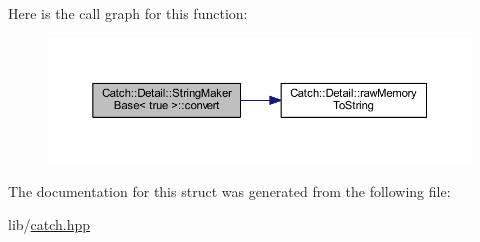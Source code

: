 Here is the call graph for this function\+:\nopagebreak
\begin{figure}[H]
\begin{center}
\leavevmode
\includegraphics[width=350pt]{struct_catch_1_1_detail_1_1_string_maker_base_3_01true_01_4_af9b5fdf7fddd8c5c873caa819e5f00f6_cgraph}
\end{center}
\end{figure}


The documentation for this struct was generated from the following file\+:\begin{DoxyCompactItemize}
\item 
lib/\hyperlink{catch_8hpp}{catch.\+hpp}\end{DoxyCompactItemize}

